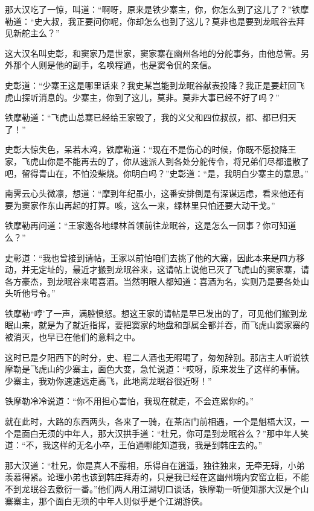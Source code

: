 \documentclass[12pt,oneside]{book}
\begin{document}
那大汉吃了一惊，叫道：``啊呀，原来是铁少寨主，你，你怎么到了这儿了？''铁摩勒道：``史大叔，我正要问你呢，你却怎么也到了这儿？莫非也是要到龙眠谷去拜见新舵主么？''

这大汉名叫史彰，和窦家乃是世家，窦家寨在幽州各地的分舵事务，由他总管。另外那个人则是他的副手，名唤程通，也是窦令侃的亲信。

史彰道：``少寨王这是哪里话来？我史某岂能到龙眠谷献表投降？我正是要赶回飞虎山探听消息的。少寨主，你到了这儿，莫非。莫非大事已经不好了吗？''

铁摩勒道：``飞虎山总寨已经给王家毁了，我的义父和四位叔叔，都、都已归天了！''

史彰大惊失色，呆若木鸡，铁摩勒道：``现在不是伤心的时候，你既不愿投降王家，飞虎山你是不能再去的了，你从速派人到各处分舵传令，将兄弟们尽都遣散了吧，留得青山在，不怕没柴烧。你明白吗？''史彰道：``是，我明白少寨主的意思。''

南霁云心头微凛，想道：``摩到年纪虽小，这番安排倒是有深谋远虑，看来他还有要为窦家作东山再起的打算。咳，这么一来，绿林里只怕还要大动干戈。''

铁摩勒再问道：``王家邀各地绿林首领前往龙眠谷，这是怎么一回事？你可知道么？''

史彰道：``我也曾接到请帖，王家以前怕咱们去挑了他的大寨，因此本来是四方移动，并无定址的，最近才搬到龙眠谷来，这请帖上说他已灭了飞虎山的窦家寨，请各方豪杰，到龙眠谷来喝喜酒。当然明眼人都知道：喜酒为名，实则乃是要各处山头听他号令。''

铁摩勒``哼'了一声，满腔愤怒。想这王家的请帖是早已发出的了，可见他们搬到龙眠山来，就是为了就近指挥，要把窦家的地盘和部属全都并吞，而飞虎山窦家寨的被消灭，也早已在他们的意料之中。

这时已是夕阳西下的时分，史、程二人酒也无暇喝了，匆匆辞别。那店主人听说铁摩勒是飞虎山的少寨主，面色大变，急忙说道：``哎呀，原来发生了这样的事情。少寨主，我劝你速速远走高飞，此地离龙眠谷很近呀！''

铁摩勒冷冷说道：``你不用担心害怕，我现在就走，不会连累你的。''

就在此时，大路的东西两头，各来了一骑，在茶店门前相遇，一个是魁梧大汉，一个是面白无须的中年人，那大汉拱手道：``杜兄，你可是到龙眠谷么？''那中年人笑道：``不，我这样的无名小卒，王伯通哪能知道我，我是到韩庄去的。''

那大汉道：``杜兄，你是真人不露相，乐得自在逍遥，独往独来，无牵无碍，小弟羡慕得紧。论理小弟也该到韩庄拜寿的，只是我已经在这幽州境内安窑立柜，不能不到龙眠谷去敷衍一番。''他们两人用江湖切口谈话，铁摩勒一听便知那大汉是个山寨寨主，那个面白无须的中年人则似乎是个江湖游侠。
\end{document}
